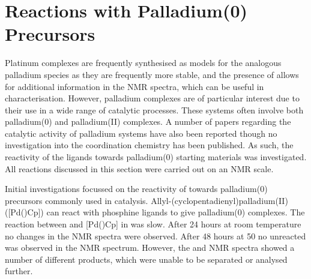 %
%
%
%
%
%




\section{Reactions with Palladium(0) Precursors}

Platinum complexes are frequently synthesised as models for the analogous palladium species as they are frequently more stable, and the presence of \Pt{} allows for additional information in the NMR spectra, which can be useful in characterisation.  However, palladium complexes are of particular interest due to their use in a wide range of catalytic processes.  These systems often involve both palladium(0) and palladium(II) complexes.  A number of papers regarding the catalytic activity of palladium \tBuxantphos{} systems have also been reported though no investigation into the coordination chemistry has been published.  As such, the reactivity of the \tBuxantphos{} ligands towards palladium(0) starting materials was investigated.  All reactions discussed in this section were carried out on an NMR scale.  

Initial investigations focussed on the reactivity of \tButhixantphos{} towards palladium(0) precursors commonly used in catalysis.  Allyl-(cyclo\-pentadienyl)\-pal\-ladium(II) ([Pd()Cp]) can react with phosphine ligands to give palladium(0) complexes. The reaction between \tButhixantphos{} and [Pd()Cp] in  was slow.  After 24 hours at room temperature no changes in the NMR spectra were observed.  After 48 hours at 50 \degC{} no unreacted \tButhixantphos{} was observed in the \phosphorus{} NMR spectrum.  However, the \phosphorus{} and \proton{} NMR spectra showed a number of different products, which were unable to be separated or analysed further.

